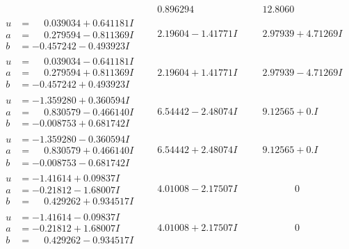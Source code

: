 \documentclass[1p]{elsarticle_modified}
\theoremstyle{definition}
\begin{document}
$$\begin{array}{c|c|c}
 & \phantom{-}0.896294\phantom{ +0.000000I} & \phantom{-}12.8060\phantom{ +0.000000I} \\ \hline\begin{aligned}
u &= \phantom{-}0.039034 + 0.641181 I \\
a &= \phantom{-}0.279594 - 0.811369 I \\
b &= -0.457242 - 0.493923 I\end{aligned}
 & \phantom{-}2.19604 - 1.41771 I & \phantom{-}2.97939 + 4.71269 I \\ \hline\begin{aligned}
u &= \phantom{-}0.039034 - 0.641181 I \\
a &= \phantom{-}0.279594 + 0.811369 I \\
b &= -0.457242 + 0.493923 I\end{aligned}
 & \phantom{-}2.19604 + 1.41771 I & \phantom{-}2.97939 - 4.71269 I \\ \hline\begin{aligned}
u &= -1.359280 + 0.360594 I \\
a &= \phantom{-}0.830579 - 0.466140 I \\
b &= -0.008753 + 0.681742 I\end{aligned}
 & \phantom{-}6.54442 - 2.48074 I & \phantom{-}9.12565 + 0. I\phantom{ +0.000000I} \\ \hline\begin{aligned}
u &= -1.359280 - 0.360594 I \\
a &= \phantom{-}0.830579 + 0.466140 I \\
b &= -0.008753 - 0.681742 I\end{aligned}
 & \phantom{-}6.54442 + 2.48074 I & \phantom{-}9.12565 + 0. I\phantom{ +0.000000I} \\ \hline\begin{aligned}
u &= -1.41614 + 0.09837 I \\
a &= -0.21812 - 1.68007 I \\
b &= \phantom{-}0.429262 + 0.934517 I\end{aligned}
 & \phantom{-}4.01008 - 2.17507 I & \phantom{-0.000000 } 0 \\ \hline\begin{aligned}
u &= -1.41614 - 0.09837 I \\
a &= -0.21812 + 1.68007 I \\
b &= \phantom{-}0.429262 - 0.934517 I\end{aligned}
 & \phantom{-}4.01008 + 2.17507 I & \phantom{-0.000000 } 0 \\ \hline\begin{aligned}

\end{aligned}
\end{array}$$
\end{document}
